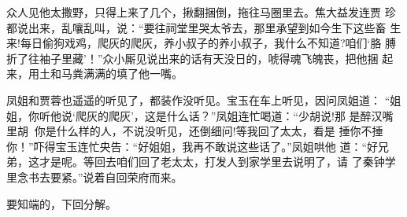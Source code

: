 众人见他太撒野，只得上来了几个，揪翻捆倒，拖往马圈里去。焦大益发连贾
珍都说出来，乱嚷乱叫，说：“要往祠堂里哭太爷去，那里承望到如今生下这些畜
生来!每日偷狗戏鸡，爬灰的爬灰，养小叔子的养小叔子，我什么不知道?咱们‘胳
膊折了往袖子里藏’！”众小厮见说出来的话有天没日的，唬得魂飞魄丧，把他捆
起来，用土和马粪满满的填了他一嘴。

凤姐和贾蓉也遥遥的听见了，都装作没听见。宝玉在车上听见，因问凤姐道：
“姐姐，你听他说‘爬灰的爬灰’，这是什么话？”凤姐连忙喝道：“少胡说!那
是醉汉嘴里胡，你是什么样的人，不说没听见，还倒细问!等我回了太太，看是
捶你不捶你！”吓得宝玉连忙央告：“好姐姐，我再不敢说这些话了。”凤姐哄他
道：“好兄弟，这才是呢。等回去咱们回了老太太，打发人到家学里去说明了，请
了秦钟学里念书去要紧。”说着自回荣府而来。

要知端的，下回分解。